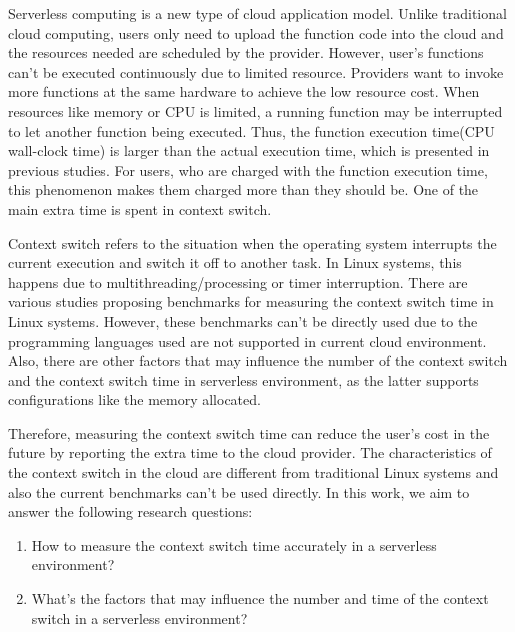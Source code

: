 


Serverless computing is a new type of cloud application model. 
Unlike traditional cloud computing, users only need to upload the function code into the cloud and the resources needed are scheduled by the provider.
However, user's functions can't be executed continuously due to limited resource. 
Providers want to invoke more functions at the same hardware to achieve the low resource cost. 
When resources like memory or CPU is limited, a running function may be interrupted to let another function being executed.
Thus, the function execution time(CPU wall-clock time) is larger than the actual execution time, which is presented in previous studies.\cite{serverless-main}
For users, who are charged with the function execution time, this phenomenon makes them charged more than they should be.
One of the main extra time is spent in context switch\cite{serverless-main}.

Context switch\cite{cs-def} refers to the situation when the operating system interrupts the current execution and switch it off to another task.
In Linux systems, this happens due to multithreading/processing or timer interruption. 
There are various studies\cite{cs-arm,cs-datasize,cs-lmbench,cs-pipes} proposing benchmarks for measuring the context switch time in Linux systems.
However, these benchmarks can't be directly used due to the programming languages used are not supported in current cloud environment.
Also, there are other factors that may influence the number of the context switch and the context switch time in serverless environment,
as the latter supports configurations like the memory allocated.

Therefore, measuring the context switch time can reduce the user's cost in the future by reporting the extra time to the cloud provider.
The characteristics of the context switch in the cloud are different from traditional Linux systems and also the current benchmarks can't be used directly.
In this work, we aim to answer the following research questions:
\begin{enumerate}
	\item How to measure the context switch time accurately in a serverless environment?
	\item What's the factors that may influence the number and time of the context switch in a serverless environment?
	
\end{enumerate}
